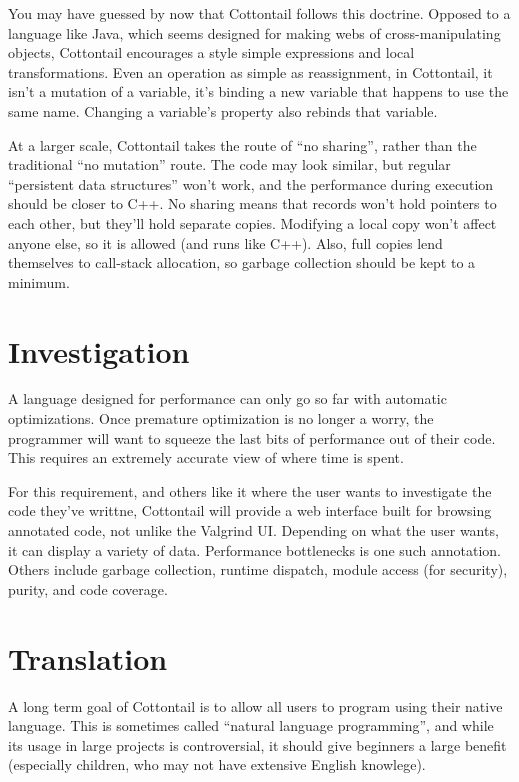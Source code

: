 You may have guessed by now that Cottontail follows this doctrine.
Opposed to a language like Java, which seems designed for making webs
of cross-manipulating objects, Cottontail encourages a style simple
expressions and local transformations. Even an operation as simple as
reassignment, in Cottontail, it isn't a mutation of a variable, it's
binding a new variable that happens to use the same name. Changing a
variable's property also rebinds that variable.

At a larger scale, Cottontail takes the route of ``no sharing'',
rather than the traditional ``no mutation'' route. The code may look
similar, but regular ``persistent data structures'' won't work, and
the performance during execution should be closer to C++. No sharing
means that records won't hold pointers to each other, but they'll hold
separate copies. Modifying a local copy won't affect anyone else, so
it is allowed (and runs like C++). Also, full copies lend themselves
to call-stack allocation, so garbage collection should be kept to a
minimum.


\section{Investigation}

A language designed for performance can only go so far with automatic
optimizations. Once premature optimization is no longer a worry, the
programmer will want to squeeze the last bits of performance out of
their code. This requires an extremely accurate view of where time is
spent.

For this requirement, and others like it where the user wants to
investigate the code they've writtne, Cottontail will provide a web
interface built for browsing annotated code, not unlike the Valgrind
UI. Depending on what the user wants, it can display a variety of
data. Performance bottlenecks is one such annotation. Others include
garbage collection, runtime dispatch, module access (for security),
purity, and code coverage.


\section{Translation}

A long term goal of Cottontail is to allow all users to program using
their native language. This is sometimes called ``natural language
programming'', and while its usage in large projects is controversial,
it should give beginners a large benefit (especially children, who may
not have extensive English knowlege).

